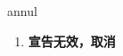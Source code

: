 
\begin{frame}
{\huge annul}
\begin{center}
\begin{enumerate}\Large
  \item \textbf{宣告无效，取消}
\end{enumerate}
\end{center}
\end{frame}
